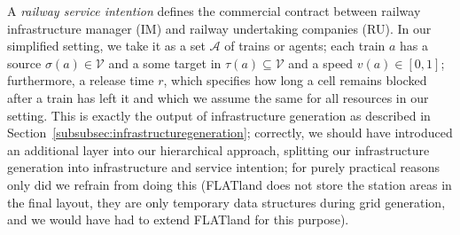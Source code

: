 \documentclass{article}
\begin{document}
A \emph{railway service intention} defines the commercial contract between railway infrastructure manager (IM) and railway undertaking companies (RU). In our simplified setting, we take it as a set $\mathcal{A}$ of trains or agents; each train $a$ has a source $\sigma(a)\in\mathcal{V}$ and a some target in $\tau(a)\subseteq\mathcal{V}$ and a speed $v(a) \in [0,1]$; furthermore, a release time $r$, which specifies how long a cell remains blocked after a train has left it and which we assume the same for all resources in our setting. This is exactly the output of infrastructure generation as described in Section~\ref{subsubsec:infrastructuregeneration}; correctly, we should have introduced an additional layer into our hierarchical approach, splitting our infrastructure generation into infrastructure and service intention; for purely practical reasons only did we refrain from doing this (FLATland does not store the station areas in the final layout, they are only temporary data structures during grid generation, and we would have had to extend FLATland for this purpose).
\end{document}
